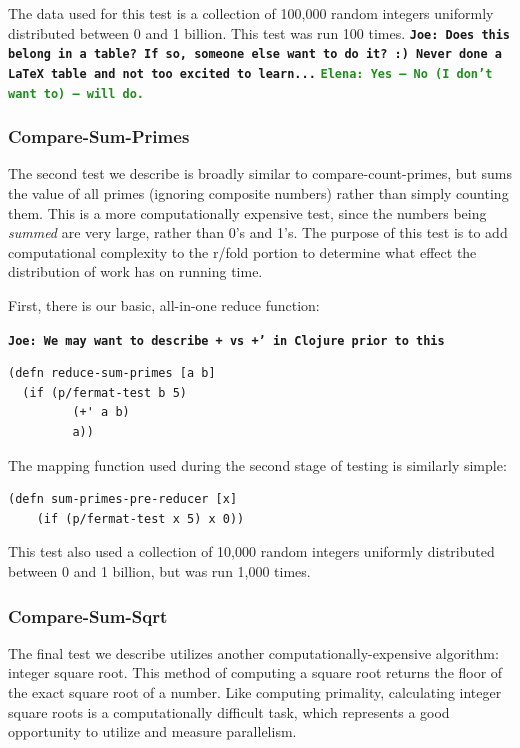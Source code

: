 \documentclass[12pt]{article}
\newcommand{\comment}[1]{{\bf \tt  {#1}}}
\newcommand{\emcomment}[1]{\textcolor{ForestGreen}{\comment{Elena: {#1}}}}
\newcommand{\joecomment}[1]{\textcolor{JoesGold}{\comment{Joe: {#1}}}}
\begin{document}
The data used for this test is a collection of 100,000 random integers uniformly distributed between 0 and 1 billion. This test was run 100 times. \joecomment{Does this belong in a table? If so, someone else want to do it? :) Never done a LaTeX table and not too excited to learn...}
\emcomment{Yes -- No (I don't want to) -- will do.}

  
\subsubsection{Compare-Sum-Primes}\label{sec:sum-primes}
The second test we describe is broadly similar to compare-count-primes, but sums the value of all primes (ignoring composite numbers) rather than simply counting them. This is a more computationally expensive test, since the numbers being \emph{summed} are very large, rather than 0's and 1's. The purpose of this test is to add computational complexity to the r/fold portion to determine what effect the distribution of work has on running time.

First, there is our basic, all-in-one reduce function:

\joecomment{We may want to describe + vs +' in Clojure prior to this}
\begin{verbatim}
(defn reduce-sum-primes [a b]
  (if (p/fermat-test b 5)
         (+' a b)
         a))
\end{verbatim}

The mapping function used during the second stage of testing is similarly simple:

\begin{verbatim}
(defn sum-primes-pre-reducer [x] 
    (if (p/fermat-test x 5) x 0))
\end{verbatim}

This test also used a collection of 10,000 random integers uniformly distributed between 0 and 1 billion, but was run 1,000 times.
 
\subsubsection{Compare-Sum-Sqrt}\label{sec:sum-sqrt}
 
The final test we describe utilizes another computationally-expensive algorithm: integer square root. This method of computing a square root returns the floor of the exact square root of a number. Like computing primality, calculating integer square roots is a computationally difficult task, which represents a good opportunity to utilize and measure parallelism. 
\end{document}
